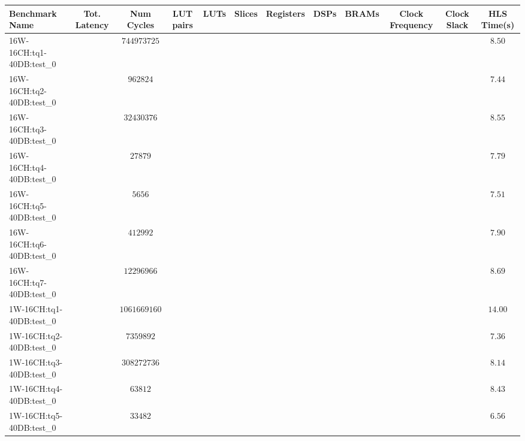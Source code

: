 \begin{tabular}{|l|c|c|c|c|c|c|c|c|c|c|c|}
\hline
Benchmark Name            & Tot. Latency & Num Cycles      & LUT pairs & LUTs & Slices & Registers & DSPs & BRAMs & Clock Frequency & Clock Slack & HLS Time(s) \\
\hline
16W-16CH:tq1-40DB:test\_0 & $          $ & $ 744973725   $ & $       $ & $  $ & $    $ & $       $ & $  $ & $   $ & $             $ & $         $ & $ 8.50    $ \\
16W-16CH:tq2-40DB:test\_0 & $          $ & $ 962824      $ & $       $ & $  $ & $    $ & $       $ & $  $ & $   $ & $             $ & $         $ & $ 7.44    $ \\
16W-16CH:tq3-40DB:test\_0 & $          $ & $ 32430376    $ & $       $ & $  $ & $    $ & $       $ & $  $ & $   $ & $             $ & $         $ & $ 8.55    $ \\
16W-16CH:tq4-40DB:test\_0 & $          $ & $ 27879       $ & $       $ & $  $ & $    $ & $       $ & $  $ & $   $ & $             $ & $         $ & $ 7.79    $ \\
16W-16CH:tq5-40DB:test\_0 & $          $ & $ 5656        $ & $       $ & $  $ & $    $ & $       $ & $  $ & $   $ & $             $ & $         $ & $ 7.51    $ \\
16W-16CH:tq6-40DB:test\_0 & $          $ & $ 412992      $ & $       $ & $  $ & $    $ & $       $ & $  $ & $   $ & $             $ & $         $ & $ 7.90    $ \\
16W-16CH:tq7-40DB:test\_0 & $          $ & $ 12296966    $ & $       $ & $  $ & $    $ & $       $ & $  $ & $   $ & $             $ & $         $ & $ 8.69    $ \\
1W-16CH:tq1-40DB:test\_0  & $          $ & $ 1061669160  $ & $       $ & $  $ & $    $ & $       $ & $  $ & $   $ & $             $ & $         $ & $ 14.00   $ \\
1W-16CH:tq2-40DB:test\_0  & $          $ & $ 7359892     $ & $       $ & $  $ & $    $ & $       $ & $  $ & $   $ & $             $ & $         $ & $ 7.36    $ \\
1W-16CH:tq3-40DB:test\_0  & $          $ & $ 308272736   $ & $       $ & $  $ & $    $ & $       $ & $  $ & $   $ & $             $ & $         $ & $ 8.14    $ \\
1W-16CH:tq4-40DB:test\_0  & $          $ & $ 63812       $ & $       $ & $  $ & $    $ & $       $ & $  $ & $   $ & $             $ & $         $ & $ 8.43    $ \\
1W-16CH:tq5-40DB:test\_0  & $          $ & $ 33482       $ & $       $ & $  $ & $    $ & $       $ & $  $ & $   $ & $             $ & $         $ & $ 6.56    $ \\

\end{tabular}
